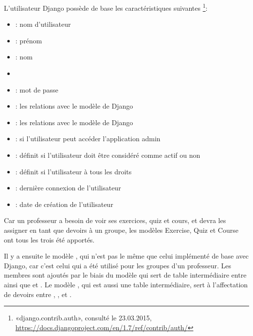 \documentclass[letterpaper,10pt,french]{sphinxmanual}
\begin{document}
L'utilisateur Django possède de base les caractéristiques suivantes \footnote{
«django.contrib.auth»,
consulté le 23.03.2015,
\href{https://docs.djangoproject.com/en/1.7/ref/contrib/auth/}{https://docs.djangoproject.com/en/1.7/ref/contrib/auth/}
}:
\begin{itemize}
\item {} 
: nom d'utilisateur

\item {} 
: prénom

\item {} 
: nom

\item {} 

\item {} 
: mot de passe

\item {} 
: les relations avec le modèle  de Django

\item {} 
: les relations avec le modèle  de Django

\item {} 
: si l'utilisateur peut accéder l'application admin

\item {} 
: définit si l'utilisateur doit être considéré comme actif ou
non

\item {} 
: définit si l'utilisateur à tous les droits

\item {} 
: dernière connexion de l'utilisateur

\item {} 
: date de création de l'utilisateur

\end{itemize}

Car un professeur a besoin de voir ses exercices, quiz et cours, et devra les
assigner en tant que devoirs à un groupe, les modèles Exercise, Quiz et Course
ont tous les trois été apportés.

Il y a ensuite le modèle , qui n'est pas le même que celui implémenté
de base avec Django, car c'est celui qui a été utilisé pour les groupes d'un
professeur. Les membres sont ajoutés par le biais du modèle 
qui sert de table intermédiaire entre  ainsi que  et
. Le modèle , qui est aussi une table intermédiaire,
sert à l'affectation de devoirs entre , ,  et
.
\end{document}
